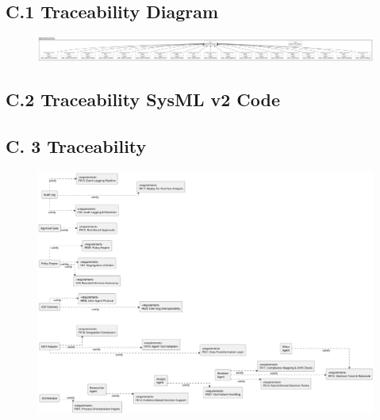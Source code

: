 \subsection*{C.1 Traceability Diagram}
\begin{figure}[H]
  \centering
  \includegraphics[width=\linewidth]{ressources/MAS/diagrams/MASArchitecture_Trace.pdf}\label{fig:trace}
\end{figure}

\subsection*{C.2 Traceability SysML v2 Code}


\subsection*{C. 3 Traceability}
\begin{figure}[H]
  \centering
  \includegraphics[width=\linewidth]{ressources/MAS/diagrams/fig-traceability.pdf}\label{fig:trace-fig}
\end{figure}


